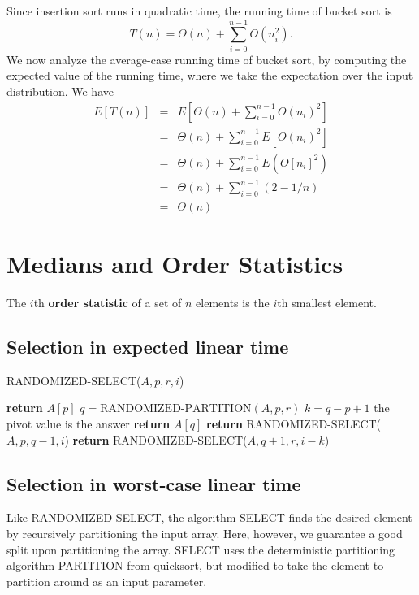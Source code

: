 \documentclass[12pt]{article}
\begin{document}
Since insertion sort runs in quadratic time, the running time of bucket sort is
\begin{equation*}
  T(n) = \Theta(n) + \sum_{i=0}^{n-1} O(n_i^2).
\end{equation*}
We now analyze the average-case running time of bucket sort, by computing the expected value of the running time, where we take the expectation over the input distribution. We have
\begin{eqnarray*}
  E[T(n)]
  &=& E \left[ \Theta (n) + \sum_{i=0}^{n-1} O(n_i)^2 \right] \\
  &=& \Theta (n) + \sum_{i=0}^{n-1} E \left[ O(n_i)^2 \right] \\
  &=& \Theta (n) + \sum_{i=0}^{n-1} E \left( O[n_i]^2 \right) \\
  &=& \Theta (n) + \sum_{i=0}^{n-1} (2 - 1/n) \\
  &=& \Theta (n)
\end{eqnarray*}

\section{Medians and Order Statistics}

The $i$th \textbf {order statistic} of a set of $n$ elements is the $i$th smallest element.

\subsection{Selection in expected linear time}

RANDOMIZED-SELECT($A, p, r, i$)
\begin{algorithmic}[1]
	\State \textbf {return } $A[p]$
\EndIf
\State $q = \text{RANDOMIZED-PARTITION}(A, p, r)$
\State $k = q - p + 1$
\Comment the pivot value is the answer
	\State \textbf {return} $A[q]$
	\State \textbf {return} RANDOMIZED-SELECT($A, p, q-1, i$)
\Else
	\State \textbf {return} RANDOMIZED-SELECT($A, q+1, r, i-k$)
\EndIf
\end{algorithmic}

\subsection{Selection in worst-case linear time}

Like RANDOMIZED-SELECT, the algorithm SELECT finds the desired element by recursively partitioning the input array. Here, however, we guarantee a good split upon partitioning the array. SELECT uses the deterministic partitioning algorithm PARTITION from quicksort, but modified to take the element to partition around as an input parameter. \\
\end{document}
